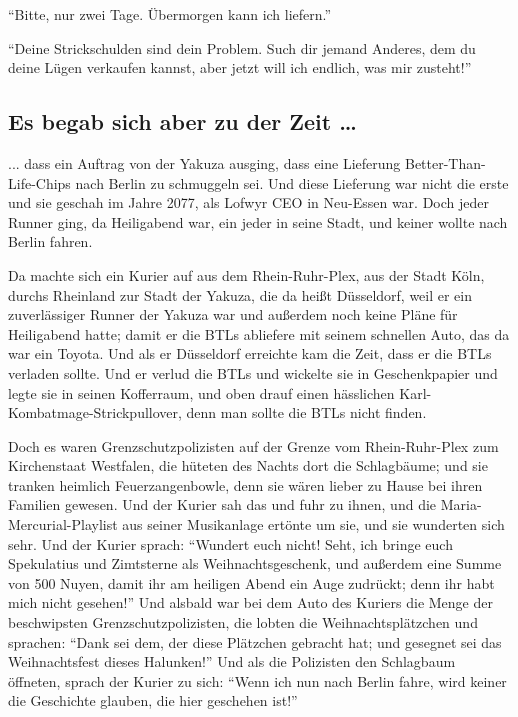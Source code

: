\documentclass[]{multiversum}
\begin{document}
\enquote{Bitte, nur zwei Tage. Übermorgen kann ich liefern.}

\enquote{Deine Strickschulden sind dein Problem. Such dir jemand Anderes, dem du deine Lügen verkaufen kannst, aber jetzt will ich endlich, was mir zusteht!}

\subsection{Es begab sich aber zu der Zeit …}
... dass ein Auftrag von der Yakuza ausging, dass eine Lieferung Better-Than-Life-Chips nach Berlin zu schmuggeln sei.
Und diese Lieferung war nicht die erste und sie geschah im Jahre 2077, als Lofwyr CEO in Neu-Essen war.
Doch jeder Runner ging, da Heiligabend war, ein jeder in seine Stadt, und keiner wollte nach Berlin fahren.

Da machte sich ein Kurier auf aus dem Rhein-Ruhr-Plex, aus der Stadt Köln, durchs Rheinland zur Stadt der Yakuza, die da heißt Düsseldorf, weil er ein zuverlässiger Runner der Yakuza war und außerdem noch keine Pläne für Heiligabend hatte; damit er die BTLs abliefere mit seinem schnellen Auto, das da war ein Toyota.
Und als er Düsseldorf erreichte kam die Zeit, dass er die BTLs verladen sollte.
Und er verlud die BTLs und wickelte sie in Geschenkpapier und legte sie in seinen Kofferraum, und oben drauf einen hässlichen Karl-Kombatmage-Strickpullover, denn man sollte die BTLs nicht finden.

Doch es waren Grenzschutzpolizisten auf der Grenze vom Rhein-Ruhr-Plex zum Kirchenstaat Westfalen, die hüteten des Nachts dort die Schlagbäume; und sie tranken heimlich Feuerzangenbowle, denn sie wären lieber zu Hause bei ihren Familien gewesen.
Und der Kurier sah das und fuhr zu ihnen, und die Maria-Mercurial-Playlist aus seiner Musikanlage ertönte um sie, und sie wunderten sich sehr.
Und der Kurier sprach: \enquote{Wundert euch nicht! Seht, ich bringe euch Spekulatius und Zimtsterne als Weihnachtsgeschenk, und außerdem eine Summe von 500 Nuyen, damit ihr am heiligen Abend ein Auge zudrückt; denn ihr habt mich nicht gesehen!}
Und alsbald war bei dem Auto des Kuriers die Menge der beschwipsten Grenzschutzpolizisten, die lobten die Weihnachtsplätzchen und sprachen:
\enquote{Dank sei dem, der diese Plätzchen gebracht hat; und gesegnet sei das Weihnachtsfest dieses Halunken!}
Und als die Polizisten den Schlagbaum öffneten, sprach der Kurier zu sich:
\enquote{Wenn ich nun nach Berlin fahre, wird keiner die Geschichte glauben, die hier geschehen ist!}
\end{document}
